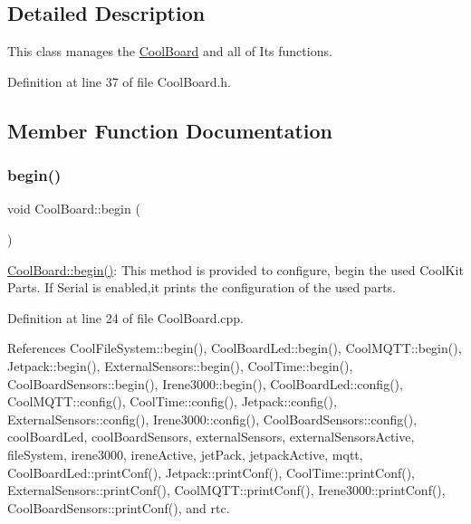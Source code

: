 \subsection{Detailed Description}
This class manages the \hyperlink{classCoolBoard}{Cool\+Board} and all of Its functions. 

Definition at line 37 of file Cool\+Board.\+h.



\subsection{Member Function Documentation}
\mbox{\label{classCoolBoard_acba7c5aef7268b2c0044bdb54d3b9d76}} 
\subsubsection{\texorpdfstring{begin()}{begin()}}
{\footnotesize\ttfamily void Cool\+Board\+::begin (\begin{DoxyParamCaption}{ }\end{DoxyParamCaption})}

\hyperlink{classCoolBoard_acba7c5aef7268b2c0044bdb54d3b9d76}{Cool\+Board\+::begin()}\+: This method is provided to configure, begin the used Cool\+Kit Parts. If Serial is enabled,it prints the configuration of the used parts. 

Definition at line 24 of file Cool\+Board.\+cpp.



References Cool\+File\+System\+::begin(), Cool\+Board\+Led\+::begin(), Cool\+M\+Q\+T\+T\+::begin(), Jetpack\+::begin(), External\+Sensors\+::begin(), Cool\+Time\+::begin(), Cool\+Board\+Sensors\+::begin(), Irene3000\+::begin(), Cool\+Board\+Led\+::config(), Cool\+M\+Q\+T\+T\+::config(), Cool\+Time\+::config(), Jetpack\+::config(), External\+Sensors\+::config(), Irene3000\+::config(), Cool\+Board\+Sensors\+::config(), cool\+Board\+Led, cool\+Board\+Sensors, external\+Sensors, external\+Sensors\+Active, file\+System, irene3000, irene\+Active, jet\+Pack, jetpack\+Active, mqtt, Cool\+Board\+Led\+::print\+Conf(), Jetpack\+::print\+Conf(), Cool\+Time\+::print\+Conf(), External\+Sensors\+::print\+Conf(), Cool\+M\+Q\+T\+T\+::print\+Conf(), Irene3000\+::print\+Conf(), Cool\+Board\+Sensors\+::print\+Conf(), and rtc.


